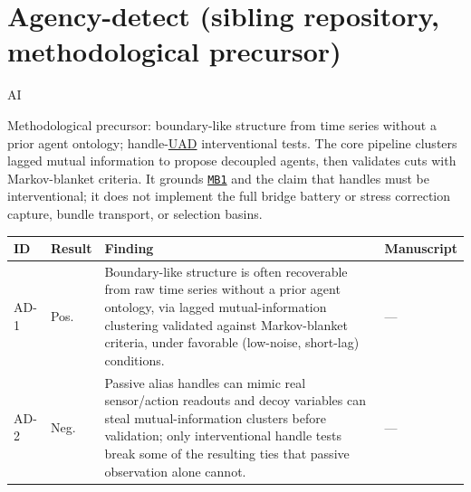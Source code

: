 \section{Agency-detect (sibling repository, methodological precursor)}
\label{sec:appn-agency-detect}
\begin{authbar}{AI}

Methodological precursor: boundary-like structure from time series without a prior agent ontology; handle-\hyperref[gloss:uad]{UAD} interventional tests. The core pipeline clusters lagged mutual information to propose decoupled agents, then validates cuts with Markov-blanket criteria. It grounds \hyperref[appbridge-crosswalk]{\texttt{MB1}} and the claim that handles must be interventional; it does not implement the full bridge battery or stress correction capture, bundle transport, or selection basins.

\small
\setlength{\tabcolsep}{3pt}
\renewcommand{\arraystretch}{1.2}
\end{authbar}
\begin{longtable}{@{}L{0.05\textwidth}L{0.08\textwidth}L{0.55\textwidth}L{0.255\textwidth}@{}}
\toprule
\textbf{ID} & \textbf{Result} & \textbf{Finding} & \textbf{Manuscript} \\
\midrule
\endhead
\bottomrule
\endfoot
\label{finding:ad-1}AD-1 & Pos. & Boundary-like structure is often recoverable from raw time series without a prior agent ontology, via lagged mutual-information clustering validated against Markov-blanket criteria, under favorable (low-noise, short-lag) conditions. & --- \\
\label{finding:ad-2}AD-2 & Neg. & Passive alias handles can mimic real sensor/action readouts and decoy variables can steal mutual-information clusters before validation; only interventional handle tests break some of the resulting ties that passive observation alone cannot. & --- \\
\end{longtable}
\normalsize
\renewcommand{\arraystretch}{1.0}

\authbarneedspace
